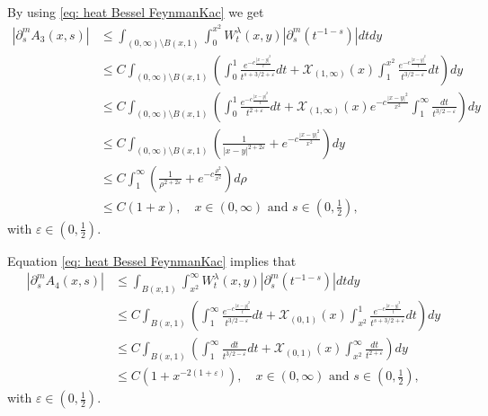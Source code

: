 \documentclass[a4paper,10pt, reqno]{amsart}
\theoremstyle{definition}
\theoremstyle{remark}
\numberwithin{equation}{section}
\begin{document}
 By using \eqref{eq: heat Bessel FeynmanKac} we get
\begin{align}\label{eq: proof Thm1.1 third term}
    |\partial_s^mA_3(x,s)|&\leq \int_{(0,\infty) \setminus B(x,1)}\int_0^{x^2} W_t^\lambda (x,y) |\partial_s^m (t^{-1-s})|dtdy\nonumber\\
    &\leq C\int_{(0,\infty) \setminus B(x,1)}\left(\int_0^1\frac{e^{-c\frac{|x-y|^2}{t}}}{t^{s+3/2+\varepsilon }}dt+\mathcal X_{(1,\infty)}(x)\int_1^{x^2}\frac{e^{-c\frac{|x-y|^2}{t}}}{t^{3/2-\varepsilon}}dt\right)dy\nonumber\\
    &\leq C\int_{(0,\infty) \setminus B(x,1)} \left(\int_0^1\frac{e^{-c\frac{|x-y|^2}{t}}}{t^{2+\varepsilon }}dt+\mathcal X_{(1,\infty)}(x)e^{-c\frac{|x-y|^2}{x^2}}\int_1^\infty \frac{dt}{t^{3/2-\varepsilon}}\right)dy\nonumber\\
    &\leq C\int_{(0,\infty) \setminus B(x,1)}\left(\frac{1}{|x-y|^{2+2\varepsilon}}+e^{-c\frac{|x-y|^2}{x^2}}\right)dy\nonumber\\
    &\leq C\int_1^\infty \left(\frac{1}{\rho ^{2+2\varepsilon}}+e^{-c\frac{\rho ^2}{x^2}}\right)d\rho\nonumber\\
    &\leq C(1+x),\quad x\in (0,\infty)\mbox{ and }s\in (0,\tfrac12),
\end{align}
with $\varepsilon \in (0,\tfrac12)$.

  Equation \eqref{eq: heat Bessel FeynmanKac} implies that
\begin{align}\label{eq: proof Thm1.1 fourth term}
    |\partial_s^mA_4(x,s)|&\leq \int_{B(x,1)}\int_{x^2}^\infty W_t^\lambda (x,y) |\partial_s^m(t^{-1-s})|dtdy\nonumber\\
    &\leq C\int_{B(x,1)}\left(\int_1^\infty\frac{e^{-c\frac{|x-y|^2}{t}}}{t^{3/2-\varepsilon }}dt+\mathcal X_{(0,1)}(x)\int_{x^2}^1\frac{e^{-c\frac{|x-y|^2}{t}}}{t^{s+3/2+\varepsilon}}dt\right)dy\nonumber\\
    &\leq C\int_{B(x,1)} \left(\int_1^\infty \frac{dt}{t^{3/2-\varepsilon }}dt+\mathcal X_{(0,1)}(x)\int_{x^2}^\infty \frac{dt}{t^{2+\varepsilon}}\right)dy\nonumber\\
    &\leq C\left(1+x^{-2(1+\varepsilon)}\right),\quad x\in (0,\infty)\mbox{ and }s\in (0,\tfrac12),
\end{align}
with $\varepsilon \in (0,\tfrac12)$.
\end{document}
